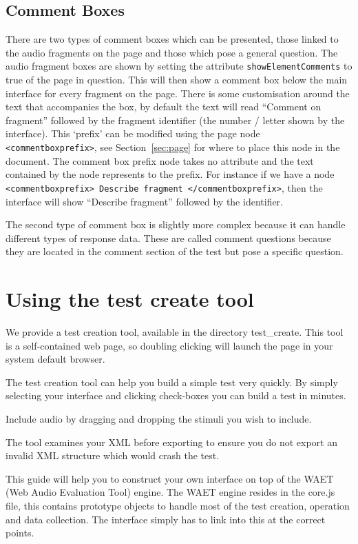 \documentclass[11pt, oneside]{article}   	%
\begin{document}
	\subsection{Comment Boxes}
	\label{sec:commentboxes}
	    There are two types of comment boxes which can be presented, those linked to the audio fragments on the page and those which pose a general question. The audio fragment boxes are shown by setting the attribute \texttt{showElementComments} to true of the page in question. This will then show a comment box below the main interface for every fragment on the page. There is some customisation around the text that accompanies the box, by default the text will read ``Comment on fragment'' followed by the fragment identifier (the number / letter shown by the interface). This `prefix' can be modified using the page node \texttt{<commentboxprefix>}, see Section~\ref{sec:page} for where to place this node in the document. The comment box prefix node takes no attribute and the text contained by the node represents to the prefix. For instance if we have a node \texttt{<commentboxprefix> Describe fragment </commentboxprefix>}, then the interface will show ``Describe fragment'' followed by the identifier.
	    
	    The second type of comment box is slightly more complex because it can handle different types of response data. These are called comment questions because they are located in the comment section of the test but pose a specific question.

\clearpage


\section{Using the test create tool}
	We provide a test creation tool, available in the directory test\_create. This tool is a self-contained web page, so doubling clicking will launch the page in your system default browser.

	The test creation tool can help you build a simple test very quickly. By simply selecting your interface and clicking check-boxes you can build a test in minutes.

	Include audio by dragging and dropping the stimuli you wish to include. 

	The tool examines your XML before exporting to ensure you do not export an invalid XML structure which would crash the test.
	
	This guide will help you to construct your own interface on top of the WAET (Web Audio Evaluation Tool) engine. The WAET engine resides in the core.js file, this contains prototype objects to handle most of the test creation, operation and data collection. The interface simply has to link into this at the correct points.
	
\end{document}

